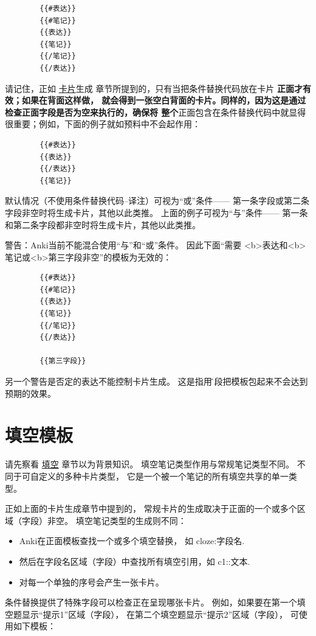 \documentclass[a4paper]{book}
\begin{document}
	\begin{shaded}\begin{verbatim}
		{{#表达}}
		{{#笔记}}
		{{表达}}
		{{笔记}}
		{{/笔记}}
		{{/表达}}
		\end{verbatim}\end{shaded}
	请记住，正如 \hyperref[cardgeneration]{卡片}生成 章节所提到的，只有当把条件替换代码放在卡片
	\textbf{正面才有效；如果在背面这样做， 就会得到一张空白背面的卡片。同样的，因为这是通过检查正面字段是否为空来执行的，确保将 整个}正面包含在条件替换代码中就显得很重要；例如，下面的例子就如预料中不会起作用：
	\begin{shaded}\begin{verbatim}
		{{#表达}}
		{{表达}}
		{{/表达}}
		{{笔记}}
		\end{verbatim}\end{shaded}
	默认情况（不使用条件替换代码--译注）可视为“或”条件—— 第一条字段或第二条字段非空时将生成卡片，其他以此类推。 上面的例子可视为“与”条件—— 第一条和第二条字段都非空时将生成卡片，其他以此类推。
	
	警告：Anki当前不能混合使用“与”和“或”条件。 因此下面“需要
	<b>表达和<b>笔记或<b>第三字段非空”的模板为无效的：
	\begin{shaded}\begin{verbatim}
		{{#表达}}
		{{#笔记}}
		{{表达}}
		{{笔记}}
		{{/笔记}}
		{{/表达}}
		
		{{第三字段}}
		\end{verbatim}\end{shaded}
	另一个警告是否定的表达不能控制卡片生成。 这是指用{{\^字段}}把模板包起来不会达到预期的效果。
	
	\section{填空模板}
	请先察看 \hyperref[cloze]{填空} 章节以为背景知识。
	填空笔记类型作用与常规笔记类型不同。 不同于可自定义的多种卡片类型， 它是一个被一个笔记的所有填空共享的单一类型。
	
	正如上面的卡片生成章节中提到的， 常规卡片的生成取决于正面的一个或多个区域（字段）非空。 填空笔记类型的生成则不同：
	
	\begin{itemize}
		\itemsep1pt\parskip0pt
		\item Anki在正面模板查找一个或多个填空替换， 如 {{cloze:字段名}}.
		\item 然后在字段名区域（字段）中查找所有填空引用，如 {{c1::文本}}.
		\item 对每一个单独的序号会产生一张卡片。
	\end{itemize}
	条件替换提供了特殊字段可以检查正在呈现哪张卡片。 例如，如果要在第一个填空题显示“提示1”区域（字段）， 在第二个填空题显示“提示2”区域（字段）， 可使用如下模板：
	
\end{document}
